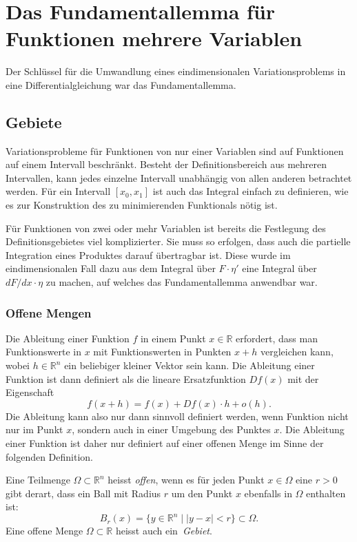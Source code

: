 %
%
%
\section{Das Fundamentallemma für Funktionen mehrere Variablen
\label{buch:felder:section:fundamentallemma}}
Der Schlüssel für die Umwandlung eines eindimensionalen Variationsproblems
in eine Differentialgleichung war das Fundamentallemma.

%
%
\subsection{Gebiete}
Variationsprobleme für Funktionen von nur einer Variablen sind auf 
Funktionen auf einem Intervall beschränkt.
Besteht der Definitionsbereich aus mehreren Intervallen, kann jedes
einzelne Intervall unabhängig von allen anderen betrachtet werden.
Für ein Intervall $[x_0,x_1]$ ist auch das Integral einfach zu definieren,
wie es zur Konstruktion des zu minimierenden Funktionals nötig ist.

Für Funktionen von zwei oder mehr Variablen ist bereits die
Festlegung des Definitionsgebietes viel komplizierter.
Sie muss so erfolgen, dass auch die partielle Integration eines
Produktes darauf übertragbar ist.
Diese wurde im eindimensionalen Fall dazu aus dem Integral
über $F\cdot\eta'$ eine Integral über $dF/dx\cdot \eta$ zu
machen, auf welches das Fundamentallemma anwendbar war.

%
%
\subsubsection{Offene Mengen}
Die Ableitung einer Funktion $f$ in einem Punkt $x\in\mathbb{R}$ erfordert,
dass man Funktionswerte in $x$ mit Funktionswerten in Punkten $x+h$
vergleichen kann, wobei $h\in\mathbb{R}^n$ ein beliebiger kleiner Vektor
sein kann.
Die Ableitung einer Funktion ist dann definiert als die lineare
Ersatzfunktion $Df(x)$ mit der Eigenschaft
\[
f(x+h) = f(x) + Df(x)\cdot h + o(h).
\]
Die Ableitung kann also nur dann sinnvoll definiert werden, wenn
Funktion nicht nur im Punkt $x$, sondern auch in einer Umgebung
des Punktes $x$.
Die Ableitung einer Funktion ist daher nur definiert auf einer
offenen Menge im Sinne der folgenden Definition.

\begin{definition}
Eine Teilmenge $\Omega\subset\mathbb{R}^n$ heisst {\em offen}, wenn es für
%
jeden Punkt $x\in\Omega$ eine $r>0$ gibt derart, dass ein
Ball mit Radius $r$ um den Punkt $x$ ebenfalls in $\Omega$ enthalten
ist:
\[
B_r(x)
=
\{y\in\mathbb{R}^n
\mid
|y-x|<r\}
\subset \Omega.
\]
Eine offene Menge $\Omega\subset\mathbb{R}$ heisst auch ein {\em Gebiet}.
%
\end{definition}

